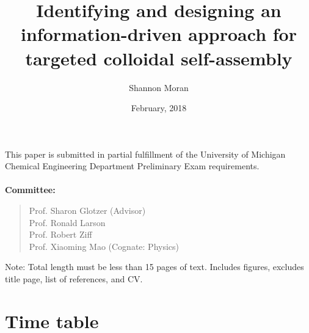 \documentclass[11pt, oneside]{article}   	%
\title{Identifying and designing an information-driven approach for targeted colloidal self-assembly}
\author{Shannon Moran}
\date{February, 2018}
\begin{document}
\maketitle
\thispagestyle{empty}
\noindent
This paper is submitted in partial fulfillment of the University of Michigan Chemical Engineering Department Preliminary Exam requirements.
\\ \\
\textbf{Committee:} 
\begin{quote} 
Prof. Sharon Glotzer (Advisor) \\ Prof. Ronald Larson \\ Prof. Robert Ziff \\ Prof. Xiaoming Mao (Cognate: Physics)
\end{quote}
\par
Note: Total length must be less than 15 pages of text. Includes figures, excludes title page, list of references, and CV.


\newpage
\thispagestyle{empty}
\tableofcontents
\newpage
\listoffigures


\newpage



\clearpage
\setcounter{page}{1}




\newpage
%





%


\section{Time table}
\end{document}
